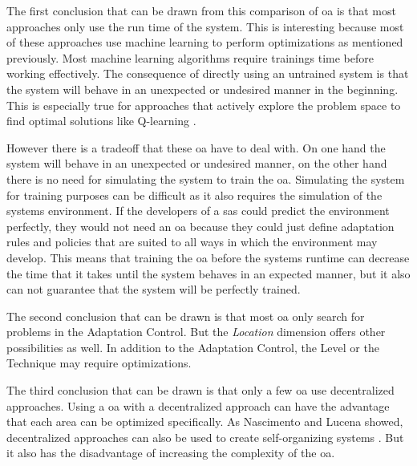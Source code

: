 \noindent The first conclusion that can be drawn from this comparison of \acrshort{oa} is that most approaches
only use the run time of the system.
This is interesting because most of these approaches use machine learning to perform optimizations as mentioned previously.
Most machine learning algorithms require trainings time before working effectively.
The consequence of directly using an untrained system is that the system will behave in an unexpected or undesired manner in the beginning.
This is especially true for approaches that actively explore the problem space to find optimal solutions like Q-learning \cite*{QLearning}.

\noindent However there is a tradeoff that these \acrshort{oa} have to deal with.
On one hand the system will behave in an unexpected or undesired manner,
on the other hand there is no need for simulating the system to train the \acrshort{oa}.
Simulating the system for training purposes can be difficult as it also requires the simulation of the systems environment.
If the developers of a \acrshort{sas} could predict the environment perfectly,
they would not need an \acrshort{oa} because they could just define adaptation rules and policies that are suited to all ways in which the environment may develop.
This means that training the \acrshort{oa} before the systems runtime can decrease the time that it takes until the system behaves in an expected manner,
but it also can not guarantee that the system will be perfectly trained.

\noindent The second conclusion that can be drawn is that most \acrshort{oa} only search for problems in the Adaptation Control.
But the \textit{Location} dimension offers other possibilities as well.
In addition to the Adaptation Control, the Level or the Technique may require optimizations.

\noindent The third conclusion that can be drawn is that only a few \acrshort{oa} use decentralized approaches.
Using a \acrshort{oa} with a decentralized approach can have the advantage that
each area can be optimized specifically.
As Nascimento and Lucena showed, decentralized approaches can also be used to create self-organizing systems \cite*{FIoT}.
But it also has the disadvantage of increasing the complexity of the \acrshort{oa}.